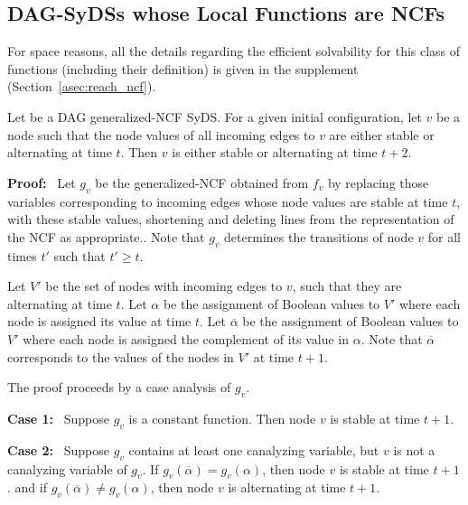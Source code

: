 \subsection{DAG-SyDSs whose Local Functions are NCFs}
\label{ssec:ncfs}

For space reasons, all the details regarding the efficient
solvability for this class of functions (including their definition) 
is given in the supplement (Section~\ref{asec:reach_ncf}).

\iffalse
\begin{lemma}\label{lem:ncf_plus_two}
Let \cals{} be a DAG generalized-NCF SyDS.
For a given initial configuration,
let $v$ be a node such that the node values of all incoming edges to $v$
are  either stable or alternating at time $t$.
Then  $v$ is either stable or alternating at time $t+2$.
\end{lemma}

\noindent
\textbf{Proof:}~ Let $g_v$ be the generalized-NCF obtained from $f_v$  
by replacing those variables corresponding to incoming edges 
whose node values are stable at time $t$,
with these stable values,
shortening and deleting lines from the representation of the NCF as appropriate.. 
Note that $g_v$ determines the transitions of node $v$ for all times $t'$ such that $t' \geq t$.

Let $V'$ be the set of nodes with incoming edges to $v$, such that they are alternating at time $t$.
Let $\alpha$  be the assignment of Boolean values to $V'$ 
where each node  is assigned its value at time $t$.
Let $\overline{\alpha}$  be the assignment of Boolean values to $V'$ 
where each node  is assigned the complement of its value in $\alpha$.
Note that $\overline{\alpha}$ corresponds to the values of the nodes in $V'$ at time $t+1$.


The proof proceeds by a case analysis of $g_v$.

\noindent
\textbf{Case 1:}~ Suppose $g_v$ is a constant function.
Then node $v$ is stable at time $t+1$.

\noindent
\textbf{Case 2:}~ Suppose $g_v$ contains at least one canalyzing variable, 
but $v$ is not a canalyzing variable of $g_v$.
If $g_v(\overline{\alpha}) = g_v(\alpha)$, then node $v$ is stable at time $t+1$.
and if $g_v(\overline{\alpha}) \neq g_v(\alpha)$, 
then node $v$ is alternating at time $t+1$.

